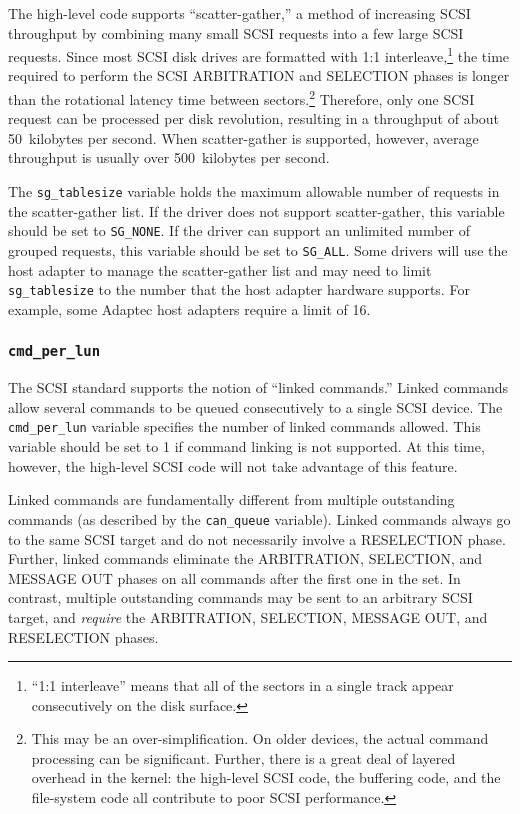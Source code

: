The high-level code supports ``scatter-gather,'' a method of increasing
SCSI throughput by combining many small SCSI requests into a few large SCSI
requests.  Since most SCSI disk drives are formatted with 1:1
interleave,\footnote{``1:1 interleave'' means that all of the sectors in a
  single track appear consecutively on the disk surface.} the time required
to perform the SCSI ARBITRATION and SELECTION phases is longer than the
rotational latency time between sectors.\footnote{This may be an
  over-simplification.  On older devices, the actual command processing can
  be significant.  Further, there is a great deal of layered overhead in
  the kernel: the high-level SCSI code, the buffering code, and the
  file-system code all contribute to poor SCSI performance.} Therefore,
only one SCSI request can be processed per disk revolution, resulting in a
throughput of about 50~kilobytes per second.  When scatter-gather is
supported, however, average throughput is usually over 500~kilobytes per
second.

The \verb|sg_tablesize| variable holds the maximum allowable number of
requests in the scatter-gather list.  If the driver does not support
scatter-gather, this variable should be set to \verb|SG_NONE|\@.  If the
driver can support an unlimited number of grouped requests, this variable
should be set to \verb|SG_ALL|\@.  Some drivers will use the host adapter
to manage the scatter-gather list and may need to limit \verb|sg_tablesize|
to the number that the host adapter hardware supports.  For example, some
Adaptec host adapters require a limit of 16.



\subsubsection{{\tt cmd\_per\_lun}}

The SCSI standard supports the notion of ``linked commands.''  Linked
commands allow several commands to be queued consecutively to a single SCSI
device.  The \verb|cmd_per_lun| variable specifies the number of linked
commands allowed.  This variable should be set to 1 if command linking is
not supported.  At this time, however, the high-level SCSI code will not
take advantage of this feature.

Linked commands are fundamentally different from multiple outstanding
commands (as described by the \verb|can_queue| variable).  Linked commands
always go to the same SCSI target and do not necessarily involve a
RESELECTION phase.  Further, linked commands eliminate the ARBITRATION,
SELECTION, and MESSAGE OUT phases on all commands after the first one in
the set.  In contrast, multiple outstanding commands may be sent to an
arbitrary SCSI target, and {\em require\/} the ARBITRATION, SELECTION,
MESSAGE OUT, and RESELECTION phases.



